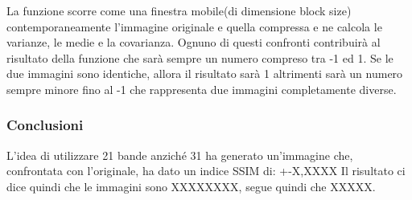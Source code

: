 \documentclass[a4paper,11pt]{article}
\begin{document}
    La funzione scorre come una finestra mobile(di dimensione block size) contemporaneamente l'immagine originale e quella compressa e ne calcola le varianze, le medie e la covarianza. 
    Ognuno di questi confronti contribuirà al risultato della funzione che sarà sempre un numero compreso tra -1 ed 1.
    Se le due immagini sono identiche, allora il risultato sarà 1 altrimenti sarà un numero sempre minore fino al -1 che rappresenta due immagini completamente diverse.
    \subsubsection{Conclusioni} 
    L'idea di utilizzare 21 bande anziché 31 ha generato un'immagine che, confrontata con l'originale, ha dato un indice SSIM di:
    +-X,XXXX
    Il risultato ci dice quindi che le immagini sono XXXXXXXX, segue quindi che XXXXX.
    
\end{document}
